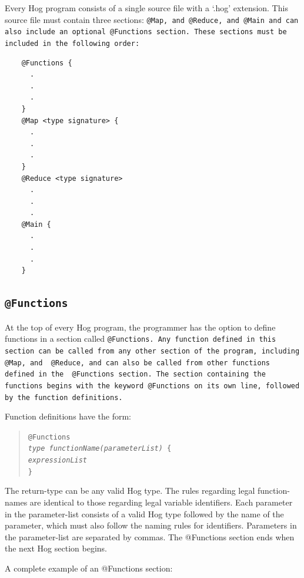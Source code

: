 \documentclass{article}
\begin{document}
Every Hog program consists of a single source file with a ‘.hog’ extension. This
source file must contain three sections: \tt @Map\rm, and \tt @Reduce\rm, and
\tt @Main \rm and can also include an optional \tt @Functions \rm section. These
sections must be included in the following order:

\begin{verbatim}
    @Functions {
      .
      .
      .
    }
    @Map <type signature> {
      .
      .
      .
    }
    @Reduce <type signature>
      .
      .
      .
    @Main {
      .
      .
      .
    }
\end{verbatim}


\subsection{\tt @Functions\rm} %
\label{sub:tt_functionsrm}

At the top of every Hog program, the programmer has the option to define functions
in a section called \tt @Functions\rm. Any function defined in this section can be
called from any other section of the program, including \tt @Map\rm, and \tt
@Reduce\rm, and can also be called from other functions defined in the \tt
@Functions \rm section. The section containing the functions begins with the
keyword \tt @Functions \rm on its own line, followed by the function definitions.

Function definitions have the form:

\begin{quotation}
  \tt @Functions \rm \\
  \indent \emph{type functionName(parameterList)} \tt \{ \rm \\
  \indent \indent \emph{expressionList} \\
  \indent \tt \} \rm
\end{quotation}

The return-type can be any valid Hog type. The rules regarding legal function-names
are identical to those regarding legal variable identifiers. Each parameter in the
parameter-list consists of a valid Hog type followed by the name of the parameter,
which must also follow the naming rules for identifiers. Parameters in the
parameter-list are separated by commas. The @Functions section ends when the next
Hog section begins.

A complete example of an @Functions section:
\end{document}

